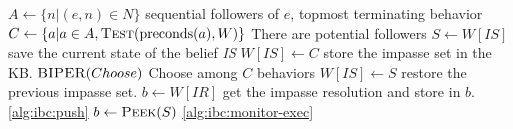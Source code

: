 \begin{algorithmic}[1]
\State $A\gets \{n | (e,n)\in N\}$ \Comment sequential followers of $e$, topmost terminating behavior
\State $C\gets \{a | a\in A, \Call{Test}{\pre(a),W}\}$
 \Comment There are potential followers
  \State $S\gets W[\textit{IS}]$ \Comment save the current state of the belief \textit{IS}
  \State $W[\textit{IS}]\gets C$ \Comment store the impasse set in the KB.
  \State $\Call{BIPER}{Choose}$ \label{alg:ibc:choose-vote} \Comment Choose among $C$ behaviors
  \State $W[\textit{IS}]\gets S$ \Comment restore the previous impasse set.
  \State $b\gets W[IR]$ \Comment get the impasse resolution and store in $b$.
   \ref{alg:ibc:push}
\EndIf
\State $b\gets\Call{Peek}{S}$ 
   \ref{alg:ibc:monitor-exec} %
\EndIf

\EndProcedure
\end{algorithmic}
